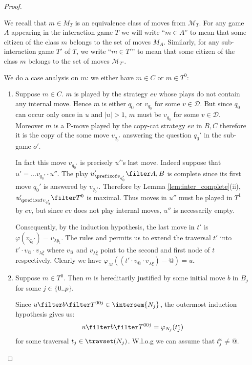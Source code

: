 \begin{proof}
\begin{enumerate}[$\bullet$]
\begin{enumerate}
We recall that $m \in M_T$ is an equivalence class of moves
from $\mathcal{M}_T$. For any game $A$ appearing in the
interaction game $T$ we will write ``$m \in A$'' to mean
that some citizen of the class $m$ belongs to the set of
moves $M_A$. Similarly, for any sub-interaction game $T'$ of
$T$, we write ``$m \in T'$'' to mean that some citizen of
the class $m$ belongs to the set of moves
$\mathcal{M}_{T'}$.

We do a case analysis on $m$: we either have $m\in C$ or $m\in T^0$:
    \begin{enumerate}[-]
    \item Suppose $m \in C$. $m$ is played by the strategy $ev$ whose plays do not contain any internal move. Hence $m$ is either $q_0$ or $v_{q_0}$ for some
    $v\in\mathcal{D}$. But since $q_0$ can occur only once in
    $u$ and $|u|>1$, $m$ must be $v_{q_0}$ for some
    $v\in \mathcal{D}$.  Moreover $m$ is a P-move played by the
    copy-cat strategy $ev$ in $B,C$ therefore it is the copy
    of the some move $v_{q_0'}$ answering the question $q_0'$ in the sub-game $o'$.

    In fact this move $v_{q_0'}$ is precisely $u'$'s last move. Indeed
    suppose that $u' = \ldots v_{q_0'} \cdot u''$. The play
    $u'_{\prefixof v_{q_0'}}\filter A,B$ is complete since its
    first move $q_0'$ is answered by $v_{q_0'}$. Therefore by
    Lemma \ref{lem:inter_complete}(ii), $u'_{\prefixof
    v_{q_0'}}\filter T^0$ is maximal. Thus moves in $u''$ must
    be played in $T^1$ by $ev$, but since $ev$ does not play internal
    moves, $u''$ is necessarily empty.

    Consequently, by the induction hypothesis, the last move in $t'$ is $\varphi(v_{q_0'}) = v_{\lambda y_1}$.
    The rules  and  permits us to extend
    the traversal $t'$ into $t' \cdot v_@ \cdot v_{\lambda \overline{\xi}}$ where $v_@$ and $v_{\lambda
    \overline{\xi}}$ point to the second and first node of $t$ respectively. Clearly we have $\varphi_M((t'\cdot v_@ \cdot v_{\lambda \overline{\xi}})-@) = u$.

    \item Suppose $m\in T^0$. Then $m$ is hereditarily justified by some initial move $b$ in $B_j$ for some $j\in \{0..p\}$.

        Since $u \filter b \filter T^{00j} \in \intersem{N_j}$, the outermost induction hypothesis gives us:
        \begin{equation}
        u \filter b \filter T^{00j} = \varphi_{N_j}(t_j^\star)  \label{eqn:corresp_outmost_ih}
        \end{equation}
          for some traversal $t_j \in \travset(N_j)$. W.l.o.g we can assume that $t_j^\omega \neq @$.


\end{enumerate}
\end{enumerate}
\end{enumerate}
\end{proof}
